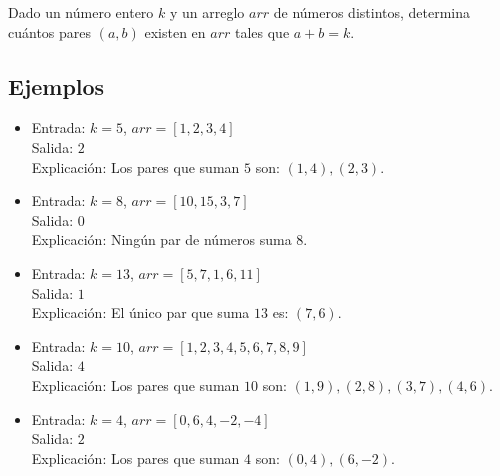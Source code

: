 Dado un número entero \( k \) y un arreglo \( arr \) de números distintos, determina cuántos pares \((a, b)\) existen en \( arr \) tales que \( a + b = k \).

\subsection*{Ejemplos}
\begin{itemize}
    \item Entrada: \( k = 5 \), \( arr = [1, 2, 3, 4] \) \\
          Salida: \( 2 \)\\
          Explicación: Los pares que suman \( 5 \) son: \( (1, 4), (2, 3) \).

    \item Entrada: \( k = 8 \), \( arr = [10, 15, 3, 7] \) \\
          Salida: \( 0 \)\\
          Explicación: Ningún par de números suma \( 8 \).

    \item Entrada: \( k = 13 \), \( arr = [5, 7, 1, 6, 11] \) \\
          Salida: \( 1 \)\\
          Explicación: El único par que suma \( 13 \) es: \( (7, 6) \).

    \item Entrada: \( k = 10 \), \( arr = [1, 2, 3, 4, 5, 6, 7, 8, 9] \) \\
          Salida: \( 4 \)\\
          Explicación: Los pares que suman \( 10 \) son: \( (1, 9), (2, 8), (3, 7), (4, 6) \).


    \item Entrada: \( k = 4 \), \( arr = [0, 6, 4, -2, -4] \) \\
          Salida: \( 2 \)\\
          Explicación: Los pares que suman \( 4 \) son: \( (0, 4), (6, -2) \).
\end{itemize}